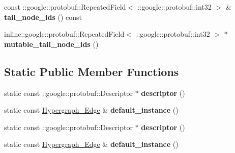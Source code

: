 \begin{DoxyCompactItemize}
\item 
\hypertarget{classHypergraph__Edge_ab2aed597bf14531310d8b8a7383d54cb}{
const ::google::protobuf::RepeatedField$<$ ::google::protobuf::int32 $>$ \& {\bfseries tail\_\-node\_\-ids} () const }
\label{classHypergraph__Edge_ab2aed597bf14531310d8b8a7383d54cb}

\item 
\hypertarget{classHypergraph__Edge_a561c8d91a2f2456595236252a966cf54}{
inline::google::protobuf::RepeatedField$<$ ::google::protobuf::int32 $>$ $\ast$ {\bfseries mutable\_\-tail\_\-node\_\-ids} ()}
\label{classHypergraph__Edge_a561c8d91a2f2456595236252a966cf54}

\end{DoxyCompactItemize}
\subsection*{Static Public Member Functions}
\begin{DoxyCompactItemize}
\item 
\hypertarget{classHypergraph__Edge_ab49ca70a823b9f46cc00824eb4b33010}{
static const ::google::protobuf::Descriptor $\ast$ {\bfseries descriptor} ()}
\label{classHypergraph__Edge_ab49ca70a823b9f46cc00824eb4b33010}

\item 
\hypertarget{classHypergraph__Edge_a1895c8b4750047a016232c5c9cf8ad09}{
static const \hyperlink{classHypergraph__Edge}{Hypergraph\_\-Edge} \& {\bfseries default\_\-instance} ()}
\label{classHypergraph__Edge_a1895c8b4750047a016232c5c9cf8ad09}

\item 
\hypertarget{classHypergraph__Edge_a4f7ad83705462267c157231c62ca4e9e}{
static const ::google::protobuf::Descriptor $\ast$ {\bfseries descriptor} ()}
\label{classHypergraph__Edge_a4f7ad83705462267c157231c62ca4e9e}

\item 
\hypertarget{classHypergraph__Edge_af42a82988e991869b1b6e7831eeea7a8}{
static const \hyperlink{classHypergraph__Edge}{Hypergraph\_\-Edge} \& {\bfseries default\_\-instance} ()}
\label{classHypergraph__Edge_af42a82988e991869b1b6e7831eeea7a8}

\end{DoxyCompactItemize}
